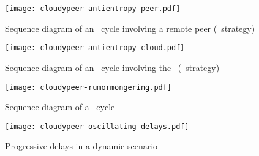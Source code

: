 \begin{figure}[H]
  \centering
  \texttt{[image: cloudypeer-antientropy-peer.pdf]}
  \caption{Sequence diagram of an \antientropy\ cycle involving a remote
    peer (\PUSHPULL\ strategy)}
  \label{fig:cloudypeer-sequence-antientropy-peer}
\end{figure}

\begin{figure}[H]
  \centering
  \texttt{[image: cloudypeer-antientropy-cloud.pdf]}
  \caption{Sequence diagram of an \antientropy\ cycle involving the
    \cloud\ (\PUSHPULL\ strategy)}
  \label{fig:cloudypeer-sequence-antientropy-cloud}
\end{figure}


\begin{figure}[H]
  \centering
  \texttt{[image: cloudypeer-rumormongering.pdf]}
  \caption{Sequence diagram of a \rumormongering\ cycle}
  \label{fig:cloudypeer-sequence-rumormongering}
\end{figure}

\begin{figure}[H]
  \centering
  \texttt{[image: cloudypeer-oscillating-delays.pdf]}
  \caption{Progressive delays in a dynamic scenario}
  \label{fig:cloudypeer-oscillating-delays}
\end{figure}
